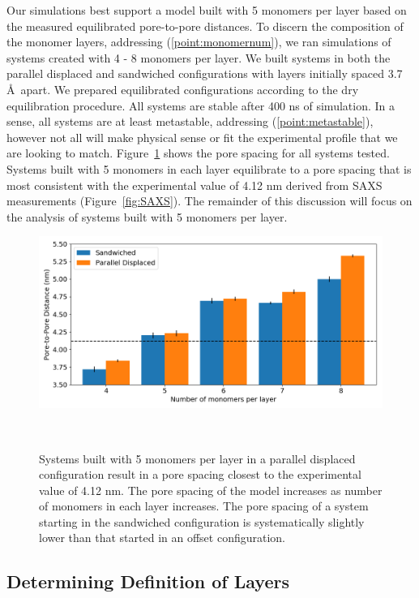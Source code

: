 \documentclass{article}
\begin{document}
  Our simulations best support a model built with 5 monomers per layer based on
  the measured equilibrated pore-to-pore distances. To discern the composition of
  the monomer layers, addressing (\ref{point:monomernum}), we ran simulations of
  systems created with 4 - 8 monomers per layer. We built systems in both the
  parallel displaced and sandwiched configurations with layers initially spaced
  3.7 \AA~apart. We prepared equilibrated configurations according to the dry
  equilibration procedure. All systems are stable after 400 ns of simulation. In
  a sense, all systems are at least metastable, addressing
  (\ref{point:metastable}), however not all will make physical sense or fit the
  experimental profile that we are looking to match. Figure~\ref{fig:p2p} shows
  the pore spacing for all systems tested. Systems built with 5 monomers in each
  layer equilibrate to a pore spacing that is most consistent with the
  experimental value of 4.12 nm derived from SAXS measurements
  (Figure~\ref{fig:SAXS}). The remainder of this discussion will focus on the
  analysis of systems built with 5 monomers per layer.

  \begin{figure}
	\centering
	\includegraphics[width=\linewidth]{p2p.png}
	\caption{Systems built with 5 monomers per layer in a parallel
		displaced configuration result in a pore spacing closest to the experimental
		value of 4.12 nm. The pore spacing of the model increases as number of monomers
		in each layer increases. The pore spacing of a system starting in the
		sandwiched configuration is systematically slightly lower than that started in
		an offset configuration. }~\label{fig:p2p}
  \end{figure}  

  \subsection{Determining Definition of Layers}
\end{document}
